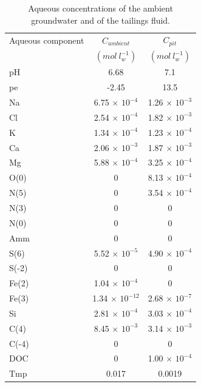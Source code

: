 
\begin{table}[hb]
\caption{Aqueous concentrations of the ambient groundwater and 
of the tailings fluid.}
\begin{center}
\begin{tabular}{l c c}
\hline
 Aqueous component       & $C_{ambient}$               & $C_{pit}$      \\
                         & $(mol\ l^{-1}_w)$        & $(mol\ l^{-1}_w)$      \\ \hline
 pH                      &   6.68                   &  7.1            \\
 pe                      &   -2.45                  & 13.5            \\
 Na                      & 6.75 $\times$ $10^{-4}$  & 1.26 $\times$ $10^{-3}$ \\ 
 Cl                      & 2.54 $\times$ $10^{-4}$  & 1.82 $\times$ $10^{-3}$ \\
 K                       & 1.34 $\times$ $10^{-4}$  & 1.23 $\times$ $10^{-4}$ \\
 Ca                      & 2.06 $\times$ $10^{-3}$  & 1.87 $\times$ $10^{-3}$ \\
 Mg                      & 5.88 $\times$ $10^{-4}$  & 3.25 $\times$ $10^{-4}$ \\
 O(0)                    & 0                        & 8.13 $\times$ $10^{-4}$ \\
 N(5)                    & 0                        & 3.54 $\times$ $10^{-4}$ \\
 N(3)                    & 0                        & 0 \\
 N(0)                    & 0                        & 0 \\
 Amm                     & 0                        & 0 \\
 S(6)                    & 5.52 $\times$ $10^{-5}$  & 4.90 $\times$ $10^{-4}$ \\
 S(-2)                   & 0                        & 0 \\
 Fe(2)                   & 1.04 $\times$ $10^{-4}$  & 0 \\
 Fe(3)                   & 1.34 $\times$ $10^{-12}$ & 2.68 $\times$ $10^{-7}$ \\
 Si                      & 2.81 $\times$ $10^{-4}$  & 3.03 $\times$ $10^{-4}$ \\
 C(4)                    & 8.45 $\times$ $10^{-3}$  & 3.14 $\times$ $10^{-3}$ \\
 C(-4)                   & 0                        & 0 \\
 DOC                     & 0                        & 1.00 $\times$ $10^{-4}$ \\
 Tmp                     & 0.017                    & 0.0019 \\ \hline
\end{tabular}
\label{ex_dd_u}
\end{center}
\end{table}
